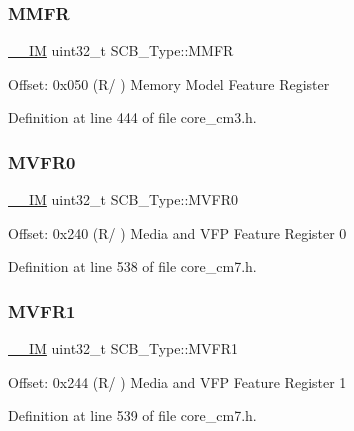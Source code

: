 \subsubsection{\texorpdfstring{M\+M\+FR}{MMFR}}
{\footnotesize\ttfamily \hyperlink{core__sc300_8h_a4cc1649793116d7c2d8afce7a4ffce43}{\+\_\+\+\_\+\+IM} uint32\+\_\+t S\+C\+B\+\_\+\+Type\+::\+M\+M\+FR}

Offset\+: 0x050 (R/ ) Memory Model Feature Register 

Definition at line 444 of file core\+\_\+cm3.\+h.

\mbox{\label{struct_s_c_b___type_a7a1ba0f875c0e97c1673882b1106e66b}} 
\subsubsection{\texorpdfstring{M\+V\+F\+R0}{MVFR0}}
{\footnotesize\ttfamily \hyperlink{core__sc300_8h_a4cc1649793116d7c2d8afce7a4ffce43}{\+\_\+\+\_\+\+IM} uint32\+\_\+t S\+C\+B\+\_\+\+Type\+::\+M\+V\+F\+R0}

Offset\+: 0x240 (R/ ) Media and V\+FP Feature Register 0 

Definition at line 538 of file core\+\_\+cm7.\+h.

\mbox{\label{struct_s_c_b___type_a75d6299150fdcbbcb765e22ff27c432e}} 
\subsubsection{\texorpdfstring{M\+V\+F\+R1}{MVFR1}}
{\footnotesize\ttfamily \hyperlink{core__sc300_8h_a4cc1649793116d7c2d8afce7a4ffce43}{\+\_\+\+\_\+\+IM} uint32\+\_\+t S\+C\+B\+\_\+\+Type\+::\+M\+V\+F\+R1}

Offset\+: 0x244 (R/ ) Media and V\+FP Feature Register 1 

Definition at line 539 of file core\+\_\+cm7.\+h.

\mbox{\label{struct_s_c_b___type_a280ef961518ecee3ed43a86404853c3d}} 
